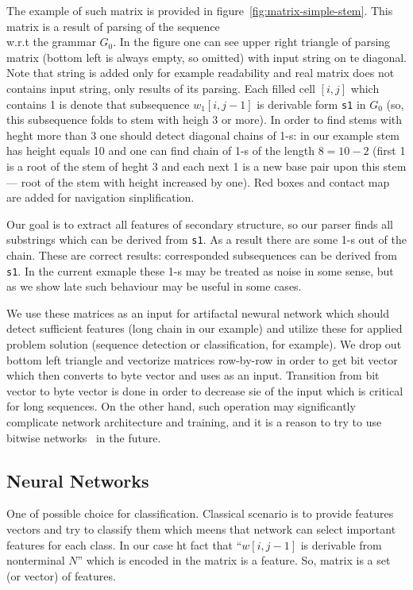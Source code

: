 \documentclass[a4paper,twoside]{article}
\begin{document}
The example of such matrix is provided in figure~\ref{fig:matrix-simple-stem}.
This matrix is a result of parsing of the sequence {  \\} w.r.t the grammar $G_0$.
In the figure one can see upper right triangle of parsing matrix (bottom left is always empty, so omitted) with input string on te diagonal.
Note that string is added only for example readability and real matrix does not contains input string, only results of its parsing.
Each filled cell $[i,j]$ which contains 1 is denote that subsequence $w_1[i,j-1]$ is derivable form \verb|s1| in $G_0$ (so, this subsequence folds to stem with heigh 3 or more).
In order to find stems with heght more than 3 one should detect diagonal chains of 1-s: in our example stem has height equals 10 and one can find chain of 1-s of the length $8=10-2$ (first 1 is a root of the stem of heght 3 and each next 1 is a new base pair upon this stem --- root of the stem with height increased by one).
Red boxes and contact map are added for navigation sinplification.

Our goal is to extract all features of secondary structure, so our parser finds all substrings which can be derived from \verb|s1|.
As a result there are some 1-s out of the chain.
These are correct results: corresponded subsequences can be derived from \verb|s1|. 
In the current exmaple these 1-s may be treated as noise in some sense, but as we show late such behaviour may be useful in some cases.

We use these matrices as an input for artifactal newural network which should detect sufficient features (long chain in our example) and utilize these for applied problem solution (sequence detection or classification, for example).
We drop out bottom left triangle and vectorize matrices row-by-row in order to get bit vector which then converts to byte vector and uses as an input.
Transition from bit vector to byte vector is done in order to decrease sie of the input which is critical for long sequences. 
On the other hand, such operation may significantly complicate network architecture and training, and it is a reason to try to use bitwise networks~\cite{DBLP:journals:corr:KimS16} in the future.  

\subsection{Neural Networks}

\noindent One of possible choice for classification.
Classical scenario is to provide features vectors and try to classify them which meens that network can select important features for each class.
In our case ht fact that ``$w[i,j-1]$ is derivable from nonterminal $N$'' which is encoded in the matrix is a feature.
So, matrix is a set (or vector) of features.
\end{document}
